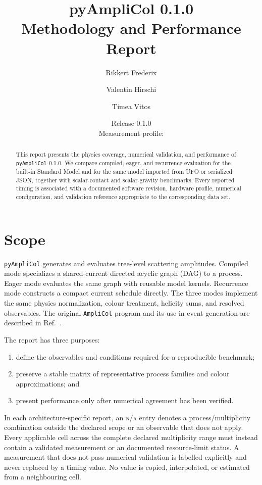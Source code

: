 \documentclass[10pt,letterpaper]{article}
\title{\vspace{-1.4cm}\textbf{pyAmpliCol 0.1.0}\\[0.35em]
  \Large Methodology and Performance Report}
\author{Rikkert Frederix \and Valentin Hirschi \and Timea Vitos}
\date{Release 0.1.0\\[0.25em]\small Measurement profile:
  \texttt{\ReportProfileName}}
\newcommand{\PAC}{\texttt{pyAmpliCol}}
\newcommand{\AC}{\texttt{AmpliCol}}
\newcommand{\ReportNA}{\textcolor{ReportMuted}{\textsc{n/a}}}
\begin{document}
\maketitle

\begin{abstract}
This report presents the physics coverage, numerical validation, and
performance of \PAC{} 0.1.0. We compare compiled, eager, and recurrence
evaluation for the built-in Standard Model and for the same model imported from
UFO or serialized JSON, together with scalar-contact and scalar-gravity
benchmarks. Every reported timing is associated with a documented software
revision, hardware profile, numerical configuration, and validation reference
appropriate to the corresponding data set.
\end{abstract}

\begingroup
\small
\setlength{\parskip}{0pt}
\tableofcontents
\endgroup
\clearpage

\section{Scope}

\PAC{} generates and evaluates tree-level scattering amplitudes. Compiled mode
specializes a shared-current directed acyclic graph (DAG) to a process. Eager
mode evaluates the same graph with reusable model kernels. Recurrence mode
constructs a compact current schedule directly. The three modes implement the
same physics normalization, colour treatment, helicity sums, and resolved
observables. The original \AC{} program and its use in event generation are
described in Ref.~\cite{FrederixVitos2026}.

The report has three purposes:
\begin{enumerate}
  \item define the observables and conditions required for a reproducible
        benchmark;
  \item preserve a stable matrix of representative process families and colour
        approximations; and
  \item present performance only after numerical agreement has been verified.
\end{enumerate}

In each architecture-specific report, an \ReportNA{} entry denotes a
process/multiplicity combination outside the declared scope or an observable
that does not apply. Every applicable cell across the complete declared
multiplicity range must instead contain a validated measurement or an
documented resource-limit status. A measurement that does not pass
numerical validation is labelled explicitly and never replaced by a timing
value. No value is copied, interpolated, or estimated from a neighbouring
cell.
\end{document}
